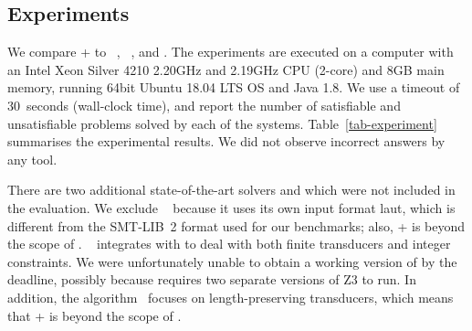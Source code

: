 \subsection{Experiments}\label{sec:exp-res}

We compare {\ostrich}+ to {\cvc}~\cite{cvc4}, {\zthree}~\cite{Z3-str}, and {\zthreetrau} \cite{Z3-trau}. 
The experiments are executed on a computer with an Intel Xeon Silver 4210 2.20GHz and 2.19GHz CPU (2-core) and 8GB main memory, running 64bit Ubuntu 18.04 LTS OS and Java 1.8. We use a timeout of 30~seconds (wall-clock time), and report the number of satisfiable and unsatisfiable problems solved by each of the systems.
Table~\ref{tab-experiment} summarises the experimental results. We did not observe incorrect answers by any tool.

There are two additional state-of-the-art solvers  {\slent} and {\trauplus} which were not included in
the evaluation. We exclude
{\slent}~\cite{DBLP:conf/kbse/WangCYJ18} because it uses its own input
format laut, which is different from the SMT-LIB~2 format used for our
benchmarks; also, {\transducerbench+} is beyond the scope of {\slent}.
%
{\trauplus}~\cite{AbdullaA+19}  integrates {\trau} with {\sloth} to deal with both finite transducers and integer constraints. We were unfortunately unable
to obtain a working version of {\trauplus} by the deadline, possibly because {\trau} requires two separate versions of Z3 to run. In addition, the algorithm~\cite{AbdullaA+19} focuses on length-preserving transducers, which means that {\transducerbench}+ is beyond the scope of \trauplus.



